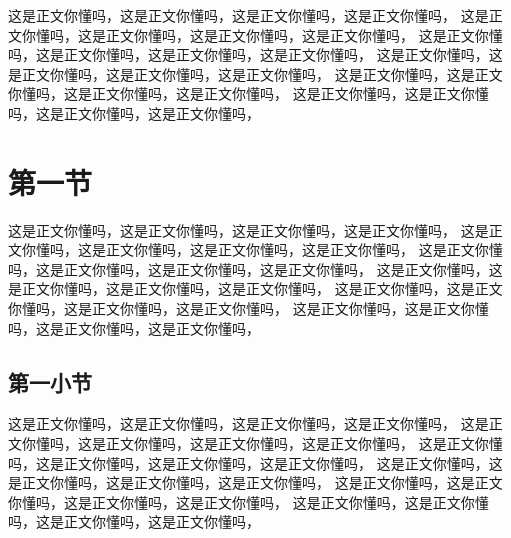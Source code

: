 \documentclass[11pt,a4paper]{article}
\title{\mytitle}
\author{\myauthor}
\begin{document}
\maketitle

\begin{abstract}
这是摘要你懂吗，这是摘要你懂吗，这是摘要你懂吗，这是摘要你懂吗，
这是摘要你懂吗，这是摘要你懂吗，这是摘要你懂吗，这是摘要你懂吗，
这是摘要你懂吗，这是摘要你懂吗，这是摘要你懂吗，这是摘要你懂吗，
这是摘要你懂吗，这是摘要你懂吗，这是摘要你懂吗，这是摘要你懂吗，
这是摘要你懂吗，这是摘要你懂吗，这是摘要你懂吗，这是摘要你懂吗，
这是摘要你懂吗，这是摘要你懂吗，这是摘要你懂吗，这是摘要你懂吗。
\end{abstract}

\newpage

\tableofcontents

\newpage

这是正文你懂吗，这是正文你懂吗，这是正文你懂吗，这是正文你懂吗，
这是正文你懂吗，这是正文你懂吗，这是正文你懂吗，这是正文你懂吗，
这是正文你懂吗，这是正文你懂吗，这是正文你懂吗，这是正文你懂吗，
这是正文你懂吗，这是正文你懂吗，这是正文你懂吗，这是正文你懂吗，
这是正文你懂吗，这是正文你懂吗，这是正文你懂吗，这是正文你懂吗，
这是正文你懂吗，这是正文你懂吗，这是正文你懂吗，这是正文你懂吗，

\section{第一节}

这是正文你懂吗，这是正文你懂吗，这是正文你懂吗，这是正文你懂吗，
这是正文你懂吗，这是正文你懂吗，这是正文你懂吗，这是正文你懂吗，
这是正文你懂吗，这是正文你懂吗，这是正文你懂吗，这是正文你懂吗，
这是正文你懂吗，这是正文你懂吗，这是正文你懂吗，这是正文你懂吗，
这是正文你懂吗，这是正文你懂吗，这是正文你懂吗，这是正文你懂吗，
这是正文你懂吗，这是正文你懂吗，这是正文你懂吗，这是正文你懂吗，

\subsection{第一小节}

这是正文你懂吗，这是正文你懂吗，这是正文你懂吗，这是正文你懂吗，
这是正文你懂吗，这是正文你懂吗，这是正文你懂吗，这是正文你懂吗，
这是正文你懂吗，这是正文你懂吗，这是正文你懂吗，这是正文你懂吗，
这是正文你懂吗，这是正文你懂吗，这是正文你懂吗，这是正文你懂吗，
这是正文你懂吗，这是正文你懂吗，这是正文你懂吗，这是正文你懂吗，
这是正文你懂吗，这是正文你懂吗，这是正文你懂吗，这是正文你懂吗，
\end{document}
